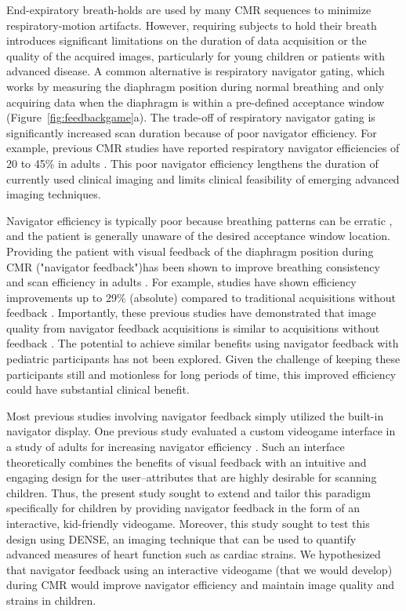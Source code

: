 	End-expiratory breath-holds are used by many CMR sequences to minimize respiratory-motion artifacts. However, requiring subjects to hold their breath introduces significant limitations on the duration of data acquisition or the quality of the acquired images, particularly for young children or patients with advanced disease. A common alternative is respiratory navigator gating, which works by measuring the diaphragm position during normal breathing and only acquiring data when the diaphragm is within a pre-defined acceptance window (Figure~\ref{fig:feedbackgame}a). The trade-off of respiratory navigator gating is significantly increased scan duration because of poor navigator efficiency. For example, previous CMR studies have reported respiratory navigator efficiencies of 20 to 45\% in adults \cite{Abd-Elmoniem2011,Feuerlein2009,Jhooti2011,Wang1996}. This poor navigator efficiency lengthens the duration of currently used clinical imaging and limits clinical feasibility of emerging advanced imaging techniques.
	
	Navigator efficiency is typically poor because breathing patterns can be erratic \cite{Liu1993,Wang1995a,Taylor1997a}, and the patient is generally unaware of the desired acceptance window location. Providing the patient with visual feedback of the diaphragm position during CMR ("navigator feedback")has been shown to improve breathing consistency and scan efficiency in adults \cite{Feuerlein2009,Liu1993}. For example, studies have shown efficiency improvements up to 29\% (absolute) compared to traditional acquisitions without feedback \cite{Feuerlein2009,Jhooti2011}. Importantly, these previous studies have demonstrated that image quality from navigator feedback acquisitions is similar to acquisitions without feedback \cite{Feuerlein2009,Jhooti2011}. The potential to achieve similar benefits using navigator feedback with pediatric participants has not been explored. Given the challenge of keeping these participants still and motionless for long periods of time, this improved efficiency could have substantial clinical benefit.
	
	Most previous studies involving navigator feedback simply utilized the built-in navigator display. One previous study evaluated a custom videogame interface in a study of adults for increasing navigator efficiency \cite{Jhooti2011}. Such an interface theoretically combines the benefits of visual feedback with an intuitive and engaging design for the user--attributes that are highly desirable for scanning children. Thus, the present study sought to extend and tailor this paradigm specifically for children by providing navigator feedback in the form of an interactive, kid-friendly videogame. Moreover, this study sought to test this design using DENSE, an imaging technique that can be used to quantify advanced measures of heart function such as cardiac strains. We hypothesized that navigator feedback using an interactive videogame (that we would develop) during CMR would improve navigator efficiency and maintain image quality and strains in children.

